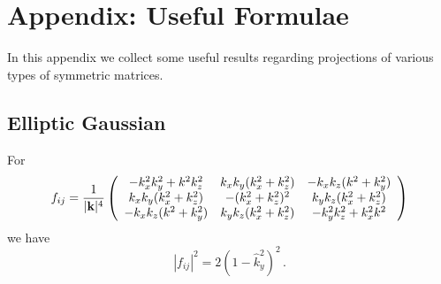 \documentclass{revtex4}
\begin{document}
\section{Appendix: Useful Formulae}
In this appendix we collect some useful results regarding projections of various types of symmetric matrices.

\subsection{Elliptic Gaussian}
For
\begin{equation}
  f_{ij} = \frac{1}{|{\bf k}|^4}\left(
  \begin{array}{ccc}
    -k_x^2k_y^2 + k^2k_z^2 & k_xk_y(k_x^2+k_z^2) & -k_xk_z(k^2+k_y^2) \\
    k_xk_y(k_x^2+k_z^2) & -(k_x^2+k_z^2)^2 & k_yk_z(k_x^2+k_z^2) \\
    -k_xk_z(k^2+k_y^2) & k_yk_z(k_x^2+k_z^2) & -k_y^2k_z^2 + k_x^2k^2 
  \end{array}\right)
\end{equation}
we have
\begin{equation}
  |f_{ij}|^2 = 2(1-\hat{k}_y^2)^2 \, .
\end{equation}
\end{document}
